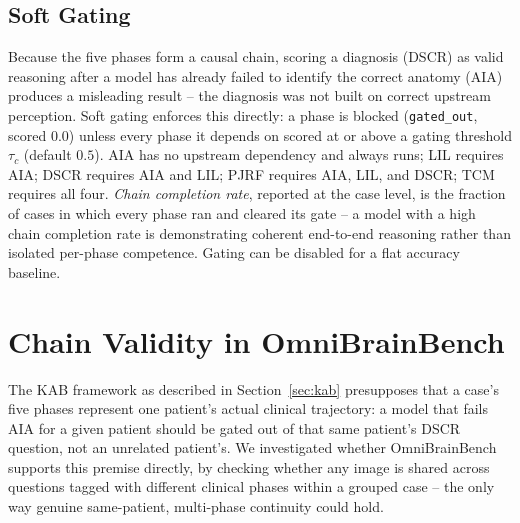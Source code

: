 \documentclass[11pt]{article}
\begin{document}
\subsection{Soft Gating}
\label{sec:gating}

Because the five phases form a causal chain, scoring a diagnosis (DSCR) as valid reasoning after a model has already failed to identify the correct anatomy (AIA) produces a misleading result -- the diagnosis was not built on correct upstream perception. Soft gating enforces this directly: a phase is blocked (\texttt{gated\_out}, scored $0.0$) unless every phase it depends on scored at or above a gating threshold $\tau_c$ (default $0.5$). AIA has no upstream dependency and always runs; LIL requires AIA; DSCR requires AIA and LIL; PJRF requires AIA, LIL, and DSCR; TCM requires all four. \emph{Chain completion rate}, reported at the case level, is the fraction of cases in which every phase ran and cleared its gate -- a model with a high chain completion rate is demonstrating coherent end-to-end reasoning rather than isolated per-phase competence. Gating can be disabled for a flat accuracy baseline.

\section{Chain Validity in OmniBrainBench}
\label{sec:chain-validity}

The KAB framework as described in Section~\ref{sec:kab} presupposes that a case's five phases represent one patient's actual clinical trajectory: a model that fails AIA for a given patient should be gated out of that same patient's DSCR question, not an unrelated patient's. We investigated whether OmniBrainBench \citep{peng2026omnibrainbench} supports this premise directly, by checking whether any image is shared across questions tagged with different clinical phases within a grouped case -- the only way genuine same-patient, multi-phase continuity could hold.
\end{document}

